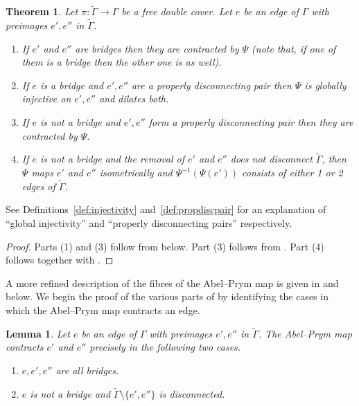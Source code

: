 \documentclass[11pt]{article}
\newtheorem{theorem}[theo]{Theorem}
\newtheorem{lemma}[theo]{Lemma}
\theoremstyle{definition}
\numberwithin{equation}{section}
\theoremstyle{definition}
\newcommand{\wt}[1]{\widetilde{#1}}
\begin{document}
\begin{theorem}\label{thm:behaviousOnEdges}
  Let $\pi\colon\wt\Gamma\to\Gamma$ be a free double cover. Let $e$ be an edge of $\Gamma$ with preimages $e',e''$ in $\wt\Gamma$.

  \begin{enumerate}
      \item If $e'$ and $e''$ are bridges then they are contracted by $\Psi$ (note that, if one of them is a bridge then the other one is as well). 

            \item If $e$ is a bridge and $e',e''$ are a properly disconnecting pair then              
             $\Psi$ is globally injective 
             on $e',e''$  
            and dilates both.

           \item If $e$ is not a bridge and $e',e''$ form  a properly disconnecting pair  then they are contracted by $\Psi$.   
      
\item If $e$ is not a bridge and the removal of $e'$ and $e''$ does not disconnect $\wt\Gamma$,  then~$\Psi$ maps $e'$ and $e''$ isometrically and  $\Psi^{-1}(\Psi(e'))$ consists of either 1 or 2 edges of $\wt\Gamma$. 
      
  \end{enumerate}
\end{theorem}

\noindent See Definitions~\ref{def:injectivity}  and~\ref{def:propdiscpair} for an explanation of ``global injectivity'' and ``properly disconnecting pairs'' respectively. 


\begin{proof}
Parts (1) and (3) follow from  below.  Part (3) follows from .
Part (4) follows  together with .  
\end{proof}

A more refined description of the fibres of the Abel--Prym map is given in   and 
below. 
We begin the proof of the various parts of  by identifying the cases  in which the Abel--Prym map contracts an edge.

\begin{lemma}\label{lem:contractedEdges}
    Let $e$ be an edge of $\Gamma$ with preimages $e',e''$ in $\wt\Gamma$. The Abel--Prym map contracts $e'$ and $e''$ precisely in the following two cases. 
    \begin{enumerate}
        \item $e,e',e''$ are all bridges.
        
        \item $e$ is not a bridge and $\wt\Gamma\setminus\{e',e''\}$ is disconnected. 
    \end{enumerate}
\end{lemma}
\end{document}
